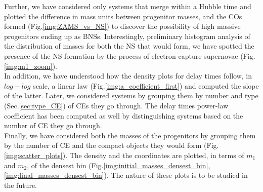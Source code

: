 \documentclass[preprint,12pt]{elsarticle}
\begin{document}
Further, we have considered only systems that merge within a Hubble time and plotted the difference in mass units between progenitor masses, and the COs formed (Fig.\ref{img:ZAMS_vs_NS}) to discover the possibility of high massive progenitors ending up as BNSs. Interestingly, preliminary histogram analysis of the distribution of masses for both the NS that would form, we have spotted the presence of the NS formation by the process of electron capture supernovae (Fig.\ref{img:m1_zoom}).\\ 

In addition, we have understood how the density plots for delay times follow, in $log-log$ scale, a linear law (Fig.\ref{img:a_coefficient_first}) and computed the slope of the latter. Later, we considered systems by grouping them by number and type (Sec.\ref{sec:type_CE}) of CEs they go through. The delay times power-law coefficient has been computed as well by distinguishing systems based on the number of CE they go through.\\

Finally, we have considered both the masses of the progenitors by grouping them by the number of CE and the compact objects they would form (Fig.\ref{img:scatter_plots}). The density and the coordinates are plotted, in terms of $m_1$ and $m_2$, of the densest bin (Fig.\ref{img:initial_masses_densest_bin}, \ref{img:final_masses_densest_bin}). The nature of these plots is to be studied in the future.








% 

\newpage









\end{document}
